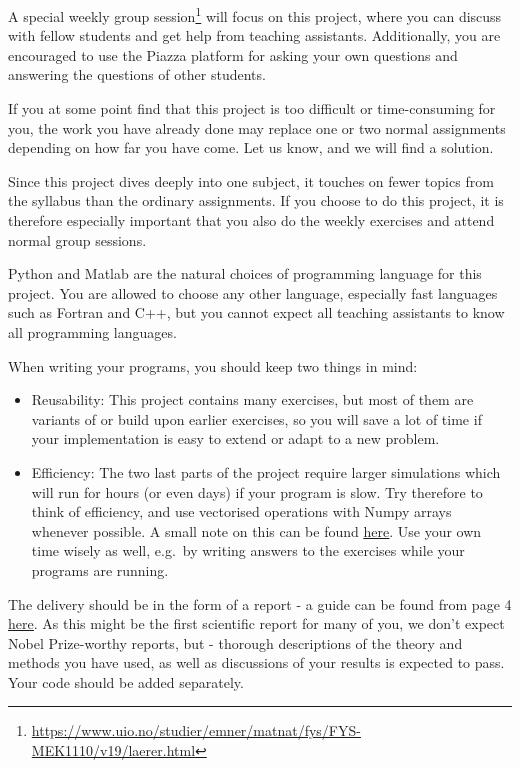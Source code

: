 \documentclass[11pt,british,a4paper]{report}
\begin{document}
A special weekly group session\footnote{\url{https://www.uio.no/studier/emner/matnat/fys/FYS-MEK1110/v19/laerer.html}} will focus on this project, where you can discuss with fellow students and get help from teaching assistants. Additionally, you are encouraged to use the Piazza platform for asking your own questions and answering the questions of other students.

If you at some point find that this project is too difficult or time-consuming for you, the work you have already done may replace one or two normal assignments depending on how far you have come. Let us know, and we will find a solution.

Since this project dives deeply into one subject, it touches on fewer topics from the syllabus than the ordinary assignments. If you choose to do this project, it is therefore especially important that you also do the weekly exercises and attend normal group sessions.

Python and Matlab are the natural choices of programming language for this project. You are allowed to choose any other language, especially fast languages such as Fortran and C++, but you cannot expect all teaching assistants to know all programming languages.

When writing your programs, you should keep two things in mind:
\begin{itemize}
    \item Reusability: This project contains many exercises, but most of them are variants of or build upon earlier exercises, so you will save a lot of time if your implementation is easy to extend or adapt to a new problem.
    \item Efficiency: The two last parts of the project require larger simulations which will run for hours (or even days) if your program is slow. Try therefore to think of efficiency, and use vectorised operations with Numpy arrays whenever possible. A small note on this can be found \href{https://github.com/uio-fys-mek/md-prosjekt/blob/master/vektorisering.ipynb}{\underline{here}}. Use your own time wisely as well, e.g.\ by writing answers to the exercises while your programs are running.
\end{itemize}

The delivery should be in the form of a report - a guide can be found from page 4 \href{http://compphysics.github.io/ComputationalPhysics/doc/pub/projectwriting/pdf/projectwriting-print.pdf}{\underline{here}}. As this might be the first scientific report for many of you, we don't expect Nobel Prize-worthy reports, but - thorough descriptions of the theory and methods you have used, as well as discussions of your results is expected to pass. Your code should be added separately.
\end{document}
